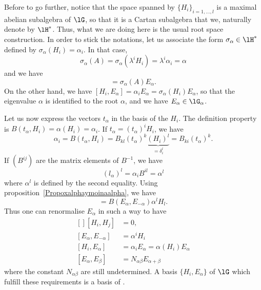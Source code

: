 Before to go further, notice that the space spanned by $\{ H_i \}_{i=1,\ldots,l}$ is a maximal abelian subalgebra of $\lG$, so that it is a Cartan subalgebra that we,  naturally denote by $\lH^*$. Thus, what we are doing here is the usual root space construction. In order to stick the notations, let us associate the form $\sigma_{\alpha}\in\lH^*$ defined by $\sigma_{\alpha}(H_i)=\alpha_i$. In that case,
\begin{equation}
    \sigma_{\alpha}(A)=\sigma_{\alpha}(\lambda^iH_i)=\lambda^i\alpha_i=\alpha
\end{equation}
and we have
\begin{equation}
    [A,E_{\alpha}]=\sigma_{\alpha}(A)E_{\alpha}.
\end{equation}
On the other hand, we have $[H_i,E_{\alpha}]=\alpha_iE_{\alpha}=\sigma_{\alpha}(H_i)E_{\alpha}$, so that the eigenvalue $\alpha$ is identified to the root $\alpha$, and we have $E_{\alpha}\in\lG_{\alpha}$.

Let us now express the vectors $t_{\alpha}$ in the basis of the $H_i$. The definition property is $B(t_{\alpha},H_i)=\alpha(H_i)=\alpha_i$. If $t_{\alpha}=(t_{\alpha})^iH_i$, we have
\begin{equation}
    \alpha_i=B(t_{\alpha},H_i)=B_{kl}(t_{\alpha})^k\underbrace{(H_i)^l}_{=\delta^l_i}=B_{ki}(t_{\alpha})^k.
\end{equation}
If $(B^{ij})$ are the matrix elements of $B^{-1}$, we have
\begin{equation}
    (l_{\alpha})^l=\alpha_iB^{il}=\alpha^l
\end{equation}
where $\alpha^l$ is defined by the second equality. Using proposition~\ref{Propoxalphaymoinaalpha}, we have
\begin{equation}
    [E_{\alpha},E_{-\alpha}]=B(E_{\alpha},E_{-\alpha})\alpha^lH_l.
\end{equation}
Thus one can renormalise $E_{\alpha}$ in such a way to have
\begin{equation}
    \begin{aligned}[]
        [H_i,H_j]       &=0,\\
        [E_{\alpha},E_{-\alpha}]    &=\alpha^iH_i\\
        [H_i,E_{\alpha}]    &=\alpha_iE_{\alpha}=\alpha(H_i)E_{\alpha}\\
        [E_{\alpha},E_{\beta}]  &=N_{\alpha\beta}E_{\alpha+\beta}
    \end{aligned}
\end{equation}
where the constant $N_{\alpha\beta}$ are still undetermined. A basis $\{ H_i,E_{\alpha} \}$ of $\lG$ which fulfill these requirements is a basis of .

